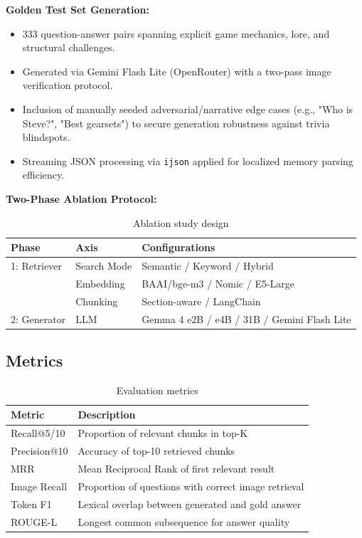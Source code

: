 \documentclass[11pt,a4paper]{article}
\begin{document}
\textbf{Golden Test Set Generation:}
\begin{itemize}
    \item 333 question-answer pairs spanning explicit game mechanics, lore, and structural challenges.
    \item Generated via Gemini Flash Lite (OpenRouter) with a two-pass image verification protocol.
    \item Inclusion of manually seeded adversarial/narrative edge cases (e.g., "Who is Steve?", "Best gearsets") to secure generation robustness against trivia blindspots.
    \item Streaming JSON processing via \texttt{ijson} applied for localized memory parsing efficiency.
\end{itemize}

\textbf{Two-Phase Ablation Protocol:}

\begin{table}[h]
\caption{Ablation study design}
\label{tab:ablation}
\centering
\begin{tabular}{lll}
\toprule
\textbf{Phase} & \textbf{Axis} & \textbf{Configurations} \\
\midrule
1: Retriever & Search Mode & Semantic / Keyword / Hybrid \\
 & Embedding & BAAI/bge-m3 / Nomic / E5-Large \\
 & Chunking & Section-aware / LangChain \\
\midrule
2: Generator & LLM & Gemma 4 e2B / e4B / 31B / Gemini Flash Lite \\
\bottomrule
\end{tabular}

\end{table}

\subsection{Metrics}

\begin{table}[h]
\caption{Evaluation metrics}
\label{tab:metrics}
\centering
\begin{tabular}{lp{8cm}}
\toprule
\textbf{Metric} & \textbf{Description} \\
\midrule
Recall@5/10 & Proportion of relevant chunks in top-K \\
Precision@10 & Accuracy of top-10 retrieved chunks \\
MRR & Mean Reciprocal Rank of first relevant result \\
Image Recall & Proportion of questions with correct image retrieval \\
Token F1 & Lexical overlap between generated and gold answer \\
ROUGE-L & Longest common subsequence for answer quality \\
\bottomrule
\end{tabular}

\end{table}
\end{document}

